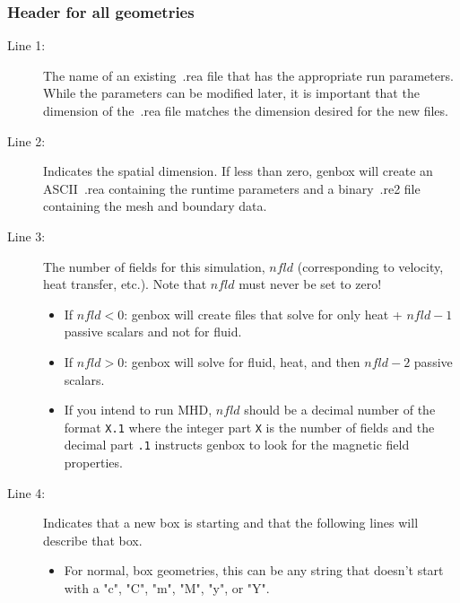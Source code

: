 \subsubsection{Header for all geometries}

\begin{description}

  \item[Line 1:] The name of an existing~.rea file that has the appropriate run
    parameters.  While the parameters can be modified later, it is important
    that the dimension of the~.rea file matches the dimension desired for the
    new files.

  \item[Line 2:] Indicates the spatial dimension. If less than zero, genbox will
    create an ASCII~.rea containing the runtime parameters and a binary~.re2
    file containing the mesh and boundary data.

  \item[Line 3:] The number of fields for this simulation, \(nfld\)
    (corresponding to velocity, heat transfer, etc.). Note that \(nfld\) must
    never be set to zero!

    \begin{itemize}

      \item If \(nfld<0\): genbox will create files that solve for only heat +
        \(nfld-1\) passive scalars and not for fluid. 

      \item If \(nfld>0\): genbox will solve for fluid, heat, and then
        \(nfld-2\) passive scalars.   
    
      \item If you intend to run MHD, \(nfld\) should be a decimal number of the
        format {\tt X.1} where the integer part {\tt X} is the number of
        fields and the decimal part {\tt .1} instructs genbox to look for
        the magnetic field properties.

    \end{itemize}

  \item[Line 4:] Indicates that a new box is starting and that the following
    lines will describe that box.  
    \begin{itemize}

      \item For normal, box geometries, this can be any string that doesn't
        start with a "c", "C", "m", "M", "y", or "Y".


\end{itemize}
\end{description}
